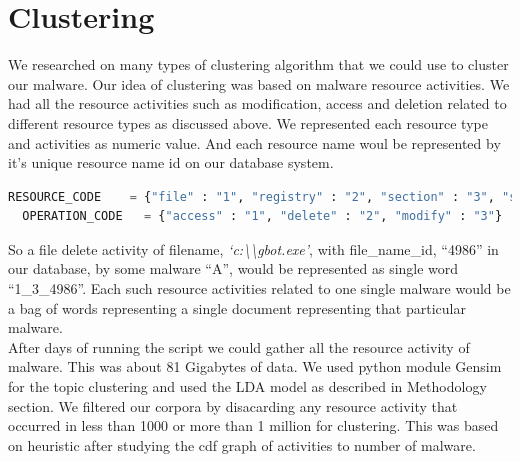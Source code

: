 \section{Clustering}
\label{sec:Clustering}
We researched on many types of clustering algorithm that we could use to cluster our malware. Our idea of clustering was based on malware resource activities.
We had all the resource activities such as modification, access and deletion related to different resource types as discussed above.
We represented each resource type and activities as numeric value. And each resource name woul be represented by it's unique resource name id on our database system.
\begin{lstlisting}[language=python,caption={Numeric codes given to resource and operation},label={lbl:numericode}]
  RESOURCE_CODE    = {"file" : "1", "registry" : "2", "section" : "3", "service" : "4", "driver" : "5", "sync" : "6", "process" : "7", "job" : "8"}
  OPERATION_CODE   = {"access" : "1", "delete" : "2", "modify" : "3"}
\end{lstlisting}
So a file delete activity of filename, \textit{`c:\textbackslash\textbackslash{}gbot.exe'}, with file\_name\_id, ``4986'' in our database, by some malware ``A'', would be represented as single word ``1\_3\_4986''. Each such resource activities related to one single malware would be a bag of words representing  a single document representing that particular malware.\\
After days of running the script we could gather all the resource activity of {\gettotalmalwareii} malware. This was about 81 Gigabytes of data.
We used python module Gensim~\cite[Gensim]{gensim}  for the topic clustering and used the LDA model as described in Methodology section. We filtered our corpora by disacarding any resource activity that occurred in less than 1000 or more than 1 million for clustering.
This was based on heuristic after studying the cdf graph of activities to number of malware.

